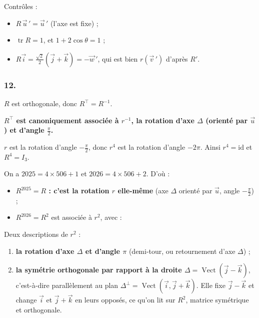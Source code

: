 \documentclass[11pt,a4paper]{article}
\providecommand{\tightlist}{\setlength{\itemsep}{0pt}\setlength{\parskip}{0pt}}
\newcommand{\equationajustee}[1]{%
  \sbox{\boiteequation}{$\displaystyle #1$}%
  \ifdim\wd\boiteequation>\linewidth
    \[\resizebox{\linewidth}{!}{\usebox{\boiteequation}}\]%
  \else
    \[#1\]%
  \fi}
\begin{document}
Contrôles :

\begin{itemize}
\tightlist
\item
  \(R\,\vec u\,'=\vec u\,'\) (l'axe est fixe) ;
\item
  \(\operatorname{tr}R=1\), et \(1+2\cos\theta=1\) ;
\item
  \(R\vec i=\frac{\sqrt2}{2}(\vec j+\vec k)=-\vec w\,'\), qui est bien \(r(\vec v\,')\) d'après \(R'\).
\end{itemize}

\hypertarget{section-10}{%
\subsubsection{12.}\label{section-10}}

\(R\) est orthogonale, donc \(R^\top=R^{-1}\).

\textbf{\(R^\top\) est canoniquement associée à \(r^{-1}\), la rotation d'axe \(\Delta\) (orienté par \(\vec u\)) et d'angle \(\frac\pi2\).}

\(r\) est la rotation d'angle \(-\frac\pi2\), donc \(r^4\) est la rotation d'angle \(-2\pi\). Ainsi \(r^4=\mathrm{id}\) et \(R^4=I_3\).

On a \(2025=4\times506+1\) et \(2026=4\times506+2\). D'où :

\begin{itemize}
\tightlist
\item
  \textbf{\(R^{2025}=R\) : c'est la rotation \(r\) elle-même} (axe \(\Delta\) orienté par \(\vec u\), angle \(-\frac\pi2\)) ;
\item
  \(R^{2026}=R^2\) est associée à \(r^2\), avec :
\end{itemize}

\equationajustee{R^2=\begin{pmatrix}-1&0&0\\0&0&-1\\0&-1&0\end{pmatrix}.}

Deux descriptions de \(r^2\) :

\begin{enumerate}
\def\labelenumi{\arabic{enumi}.}
\tightlist
\item
  \textbf{la rotation d'axe \(\Delta\) et d'angle \(\pi\)} (demi-tour, ou retournement d'axe \(\Delta\)) ;
\item
  \textbf{la symétrie orthogonale par rapport à la droite \(\Delta=\operatorname{Vect}(\vec j-\vec k)\)}, c'est-à-dire parallèlement au plan \(\Delta^\perp=\operatorname{Vect}(\vec i,\vec j+\vec k)\). Elle fixe \(\vec j-\vec k\) et change \(\vec i\) et \(\vec j+\vec k\) en leurs opposés, ce qu'on lit sur \(R^2\), matrice symétrique et orthogonale.
\end{enumerate}
\end{document}
